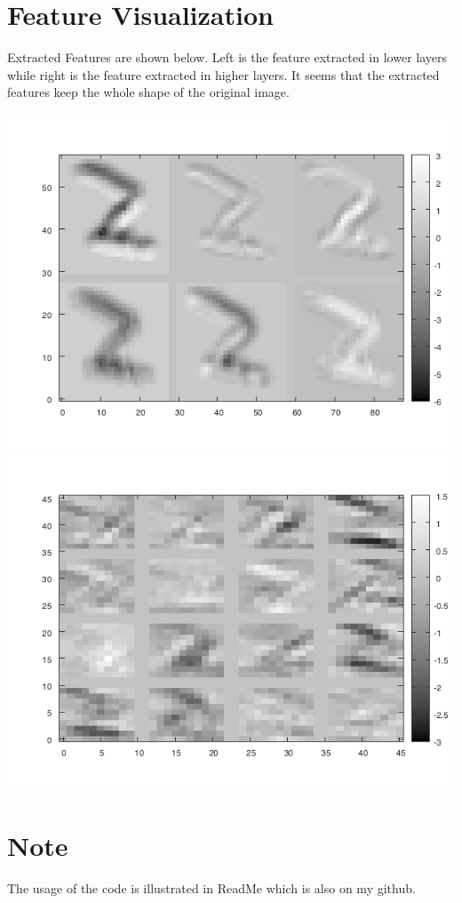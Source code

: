 \documentclass[12pt]{article}
\begin{document}
\section{Feature Visualization}
Extracted Features are shown below. Left is the feature extracted in lower layers while right is the feature extracted in higher layers. It seems that the extracted features keep the whole shape of the original image. 
\begin{center}
  \includegraphics[angle = 0, width = .48\textwidth]{./feature_images/label_2_feature_1.png}
  \includegraphics[angle = 0, width = .48\textwidth]{./feature_images/label_2_feature_2.png}
\end{center}
\section{Note}
The usage of the code is illustrated in ReadMe which is also on my github.
\end{document}
